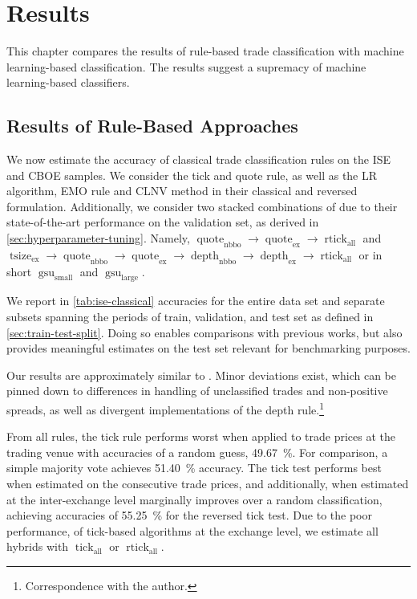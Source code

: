 \section{Results}\label{sec:results}

This chapter compares the results of rule-based trade classification with machine learning-based classification. The results suggest a supremacy of machine learning-based classifiers.

\subsection{Results of Rule-Based Approaches}\label{sec:result-of-rule-based-approaches}

We now estimate the accuracy of classical trade classification rules on the \gls{ISE} and \gls{CBOE} samples. We consider the tick and quote rule, as well as the \gls{LR} algorithm, \gls{EMO} rule and \gls{CLNV} method in their classical and reversed formulation. Additionally, we consider two stacked combinations of \textcite[][12--14]{grauerOptionTradeClassification2022} due to their state-of-the-art performance on the validation set, as derived in \cref{sec:hyperparameter-tuning}. Namely, $\operatorname{quote}_{\mathrm{nbbo}} \to \operatorname{quote}_{\mathrm{ex}} \to \operatorname{rtick}_{\mathrm{all}}$ and $\operatorname{tsize}_{\mathrm{ex}} \to \operatorname{quote}_{\mathrm{nbbo}} \to \operatorname{quote}_{\mathrm{ex}} \to \operatorname{depth}_{\mathrm{nbbo}} \to \operatorname{depth}_{\mathrm{ex}} \to \operatorname{rtick}_{\mathrm{all}}$ or in short $\operatorname{gsu}_{\mathrm{small}}$ and $\operatorname{gsu}_{\mathrm{large}}$.

We report in \cref{tab:ise-classical} accuracies for the entire data set and separate subsets spanning the periods of train, validation, and test set as defined in \cref{sec:train-test-split}. Doing so enables comparisons with previous works, but also provides meaningful estimates on the test set relevant for benchmarking purposes.

Our results are approximately similar to \textcite[][29--33]{grauerOptionTradeClassification2022}. Minor deviations exist, which can be pinned down to differences in handling of unclassified trades and non-positive spreads, as well as divergent implementations of the depth rule.\footnote{Correspondence with the author.}

From all rules, the tick rule performs worst when applied to trade prices at the trading venue with accuracies of a random guess, \SI{49.67}{\percent}. For comparison, a simple majority vote achieves \SI{51.40}{\percent} accuracy. The tick test performs best when estimated on the consecutive trade prices, and additionally, when estimated at the inter-exchange level marginally improves over a random classification, achieving accuracies of \SI{55.25}{\percent} for the reversed tick test. Due to the poor performance, of tick-based algorithms at the exchange level, we estimate all hybrids with $\operatorname{tick}_{\mathrm{all}}$ or $\operatorname{rtick}_{\mathrm{all}}$.


